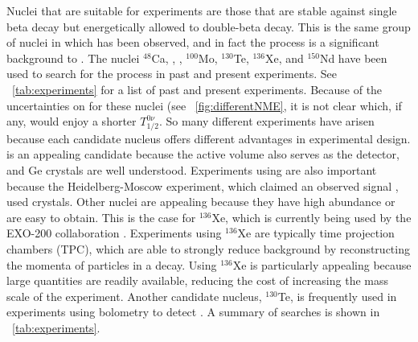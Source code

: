 Nuclei that are suitable for \zvbb experiments are those that are stable against single beta decay but energetically allowed to double-beta decay.  This is the same group of nuclei in which \tvbb has been observed, and in fact the \tvbb process is a significant background to \zvbb.  The nuclei $^{48}$Ca, , , $^{100}$Mo, $^{130}$Te, $^{136}$Xe, and $^{150}$Nd have been used to search for the process in past and present experiments.  See {\tab}~\ref{tab:experiments} for a list of past and present experiments.  Because of the uncertainties on \NME for these nuclei (see {\fig}~\ref{fig:differentNME}, it is not clear which, if any, would enjoy a shorter $T^{0\nu}_{1/2}$.  So many different experiments have arisen because each candidate nucleus offers different advantages in experimental design.   is an appealing candidate because the active volume also serves as the detector, and Ge crystals are well understood.  Experiments using  are also important because the Heidelberg-Moscow experiment, which claimed an observed \zvbb signal \citep{KlapdorKleingrothaus}, used  crystals.  Other nuclei are appealing because they have high abundance or are easy to obtain.  This is the case for $^{136}$Xe, which is currently being used by the EXO-200 collaboration \citep{EXO200}.  Experiments using $^{136}$Xe are typically time projection chambers (TPC), which are able to strongly reduce background by reconstructing the momenta of particles in a decay.  Using $^{136}$Xe is particularly appealing because large quantities are readily available, reducing the cost of increasing the mass scale of the experiment.  Another candidate nucleus, $^{130}$Te, is frequently used in experiments using bolometry to detect \zvbb.  A summary of \zvbb searches is shown in {\tab}~\ref{tab:experiments}.
